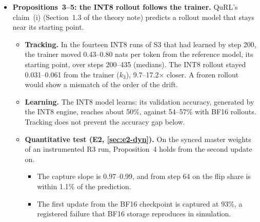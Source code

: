 \documentclass[11pt]{article}
\begin{document}
\begin{itemize}
\begin{itemize}
  \item \textbf{H2 (registered): inconclusive on accuracy, supported on mismatch.} The late-accuracy interaction is $-0.1$ points with a 90\% CI of $[-4.5, 4.3]$, too wide to show equivalence within $\pm\delta$, as the power analysis predicted. One secondary endpoint, final accuracy, detected a small interaction ($+1.7$ points, inside $\pm\delta$): UAQ did slightly better on final accuracy with INT8 rollouts than with BF16. Nothing in the theory predicts such an interaction, and late accuracy shows none, so it is a candidate for a confirmatory run, not a finding.
  \item \textbf{H3 (registered): inconclusive.} By Theorem~2, R6 and R4 are different optimizers: R6 multiplies the learning rate of all 290 actor tensors by 1.5, while UAQ in effect multiplies that of the 72 Q/K/V weights by 1.5 and divides that of the 24 norm gains by 1.5. In accuracy the two cannot be told apart with three seeds (late: $-0.5$ points, 90\% CI $[-5.2, 4.2]$). R6's mismatch was lower than R4's in every seed (ratio 0.51, 90\% CI $[0.26, 1.00]$), which no result here predicts.
  \end{itemize}
\item \textbf{Propositions~3--5: the INT8 rollout follows the trainer.} QuRL's claim~(i) (Section~1.3 of the theory note) predicts a rollout model that stays near its starting point.
  \begin{itemize}
  \item \textbf{Tracking.} In the fourteen INT8 runs of S3 that had learned by step 200, the trainer moved 0.43--0.80 nats per token from the reference model, its starting point, over steps 200--435 (medians). The INT8 rollout stayed 0.031--0.061 from the trainer ($k_3$), 9.7--17.2$\times$ closer. A frozen rollout would show a mismatch of the order of the drift.
  \item \textbf{Learning.} The INT8 model learns: its validation accuracy, generated by the INT8 engine, reaches about 50\%, against 54--57\% with BF16 rollouts. Tracking does not prevent the accuracy gap below.
  \item \textbf{Quantitative test (E2, \cref{sec:e2-dyn}).} On the synced master weights of an instrumented R3 run, Proposition~4 holds from the second update on.
    \begin{itemize}
    \item The capture slope is 0.97--0.99, and from step 64 on the flip share is within 1.1\% of the prediction.
    \item The first update from the BF16 checkpoint is captured at 93\%, a registered failure that BF16 storage reproduces in simulation.

\end{itemize}
\end{itemize}
\end{itemize}
\end{document}
